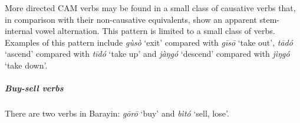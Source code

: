 More directed CAM verbs may be found in a small class of causative verbs that, in comparison with their non-causative equivalents, show an apparent stem-internal vowel alternation. This pattern is limited to a small class of verbs. Examples of this pattern include \textit{gùsò} `exit' compared with \textit{gīsō} `take out', \textit{tādó} `ascend' compared with \textit{tīdó} `take up' and \textit{jàŋgó} `descend' compared with \textit{jìŋgó} `take down'. 

\subparagraph{Buy-sell verbs}

There are two verbs in Barayin: \textit{gōrō} `buy' and \textit{bìtó} `sell, lose'. 
